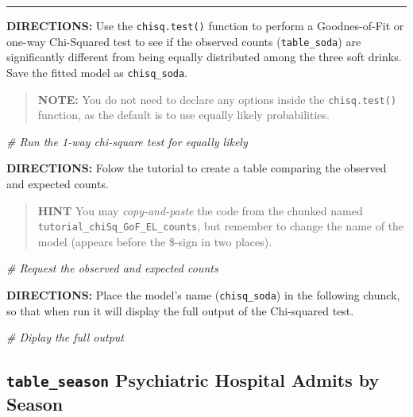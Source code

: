 \documentclass[
]{article}
\newenvironment{Shaded}{\begin{snugshade}}{\end{snugshade}}
\newcommand{\CommentTok}[1]{\textcolor[rgb]{0.56,0.35,0.01}{\textit{#1}}}
\begin{document}
\begin{center}\rule{0.5\linewidth}{0.5pt}\end{center}

\textbf{DIRECTIONS:} Use the \texttt{chisq.test()} function to perform a
Goodnes-of-Fit or one-way Chi-Squared test to see if the observed counts
(\texttt{table\_soda}) are significantly different from being equally
distributed among the three soft drinks. Save the fitted model as
\texttt{chisq\_soda}.

\begin{quote}
\textbf{NOTE:} You do not need to declare any options inside the
\texttt{chisq.test()} function, as the default is to use equally likely
probabilities.
\end{quote}

\begin{Shaded}
\begin{Highlighting}[]
\CommentTok{\# Run the 1{-}way chi{-}square test for equally likely}
\end{Highlighting}
\end{Shaded}

\textbf{DIRECTIONS:} Folow the tutorial to create a table comparing the
observed and expected counts.

\begin{quote}
\textbf{HINT} You may \emph{copy-and-paste} the code from the chunked
named \texttt{tutorial\_chiSq\_GoF\_EL\_counts}, but remember to change
the name of the model (appears before the \$-sign in two places).
\end{quote}

\begin{Shaded}
\begin{Highlighting}[]
\CommentTok{\# Request the observed and expected counts}
\end{Highlighting}
\end{Shaded}

\textbf{DIRECTIONS:} Place the model's name (\texttt{chisq\_soda}) in
the following chunck, so that when run it will display the full output
of the Chi-squared test.

\begin{Shaded}
\begin{Highlighting}[]
\CommentTok{\# Diplay the full output}
\end{Highlighting}
\end{Shaded}

\clearpage

\hypertarget{table_season-psychiatric-hospital-admits-by-season}{%
\subsection{\texorpdfstring{\texttt{table\_season} Psychiatric Hospital
Admits by
Season}{table\_season Psychiatric Hospital Admits by Season}}\label{table_season-psychiatric-hospital-admits-by-season}}
\end{document}
